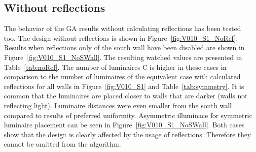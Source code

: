 \subsection{Without reflections}

The behavior of the GA results without calculating reflections has been tested too. The design without reflections is shown in Figure~\ref{fig:V010_S1_NoRef}. Results when reflections only of the south wall have been disabled are shown in Figure~\ref{fig:V010_S1_NoSWall}. The resulting watched values are presented in Table~\ref{tab:noRef}. The number of luminaires C is higher in these cases in comparison to the number of luminaires of the equivalent case with calculated reflections for all walls in Figure~\ref{fig:V010_S1} and Table~\ref{tab:symmetry}. It is common that the luminaires are placed closer to walls that are darker (walls not reflecting light). Luminaire distances were even smaller from the south wall compared to results of preferred uniformity. Asymmetric illuminace for symmetric luminaire placement can be seen in Figure~\ref{fig:V010_S1_NoSWall}. Both cases show that the design is clearly affected by the usage of reflections. Therefore they cannot be omitted from the algorithm.

